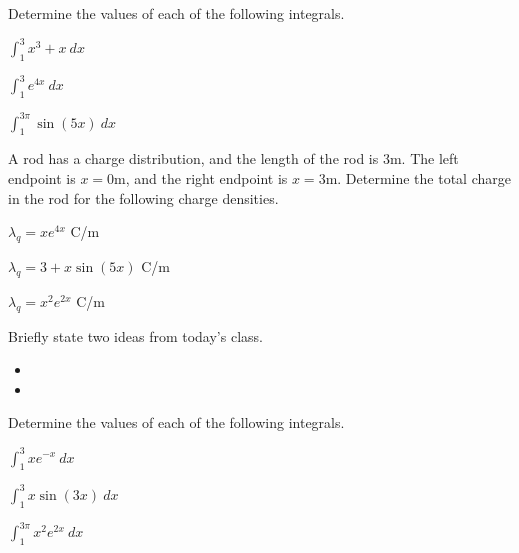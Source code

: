 \begin{problem}
\item Determine the values of each of the following integrals.
  \begin{subproblem}
  \item $\int^{3}_1 x^3+x ~ dx$
    \vfill
  \item $\int^{3}_1 e^{4x} ~ dx$
    \vfill
  \item $\int^{3\pi}_1 \sin(5x) ~ dx$
    \vfill
  \end{subproblem}
\end{problem}



\begin{problem}
\item A rod has a charge distribution, and the length of the rod is
  3m. The left endpoint is $x=0$m, and the right endpoint is
  $x=3$m. Determine the total charge in the rod for the following
  charge densities. 
  \begin{subproblem}
    \item $\lambda_q = xe^{4x}$ C/m
      \vfill
    \item $\lambda_q = 3+x\sin(5x)$ C/m
      \vfill
    \item $\lambda_q = x^2 e^{2x} $ C/m
      \vfill
  \end{subproblem}
\end{problem}

\postClass

\begin{problem}
\item Briefly state two ideas from today's class.
  \begin{itemize}
  \item 
  \item 
  \end{itemize}
\item 
  \begin{subproblem}
    \item
  \end{subproblem}
\end{problem}



\begin{problem}
\item Determine the values of each of the following integrals.
  \begin{subproblem}
  \item $\int^{3}_1 x e^{-x} ~ dx$
    \vfill
  \item $\int^{3}_1 x\sin(3x) ~ dx$
    \vfill
  \item $\int^{3\pi}_1 x^2 e^{2x} ~ dx$
    \vfill
  \end{subproblem}
\end{problem}



